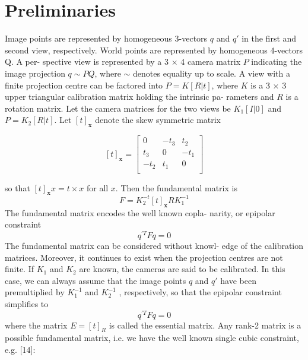 \documentclass[10pt,twocolumn,letterpaper]{article}
\begin{document}
\section {\label{sec:Preliminaries}Preliminaries}
Image points are represented by homogeneous 3-vectors $q$
and $q'$ in the first and second view, respectively. World
points are represented by homogeneous 4-vectors Q. A per-
spective view is represented by a 3 × 4 camera matrix $P$
indicating the image projection $q\sim PQ$, where $\sim $ denotes
equality up to scale. A view with a finite projection centre
can be factored into $P = K \left[R |t\right]$, where $K$ is a 3 × 3
upper triangular calibration matrix holding the intrinsic pa-
rameters and $R$ is a rotation matrix. Let the camera matrices
for the two views be $K_1 \left[I | 0\right]$ and $P = K_2 \left[R | t\right]$. Let $[t]_\mathbf{x}$
denote the skew symmetric matrix


\begin{equation}
    \left[t\right]_\mathbf{x} =
     \left[
    \begin{array}{ccc}
    0 & -t_3 & t_2 \\
    t_3 & 0 & -t_1 \\
    -t_2 & t_1 & 0 \\
    \end{array}
    \right]
    \label{eq:eq1}
\end{equation}

{\small

}

so that $\left[t\right]_\mathbf{x}x = t\times x$ for all $x$. Then the fundamental matrix
is
\begin{equation}
   F=K_2^{-t} \left[t\right] _\mathbf{x}RK_1^{-1}
    \label{eq:eq2}
\end{equation}
The fundamental matrix encodes the well known copla-
narity, or epipolar constraint
\begin{equation}
    q^{'T}Fq=0
    \label{eq:eq3}
\end{equation}
The fundamental matrix can be considered without knowl-
edge of the calibration matrices. Moreover, it continues to
exist when the projection centres are not finite. If $K_1$ and
$K_2$ are known, the cameras are said to be calibrated. In this
case, we can always assume that the image points $q$ and $q'$
have been premultiplied by $K_1^{-1}$ and $K_2^{-1}$
, respectively, so
that the epipolar constraint simplifies to
\begin{equation}
    q^{'T}Fq=0
    \label{eq:eq4}
\end{equation}
where the matrix $E=\left[t\right]_R$ is called the essential matrix.
Any rank-2 matrix is a possible fundamental matrix, i.e. we
have the well known single cubic constraint, e.g. [14]:
\end{document}
